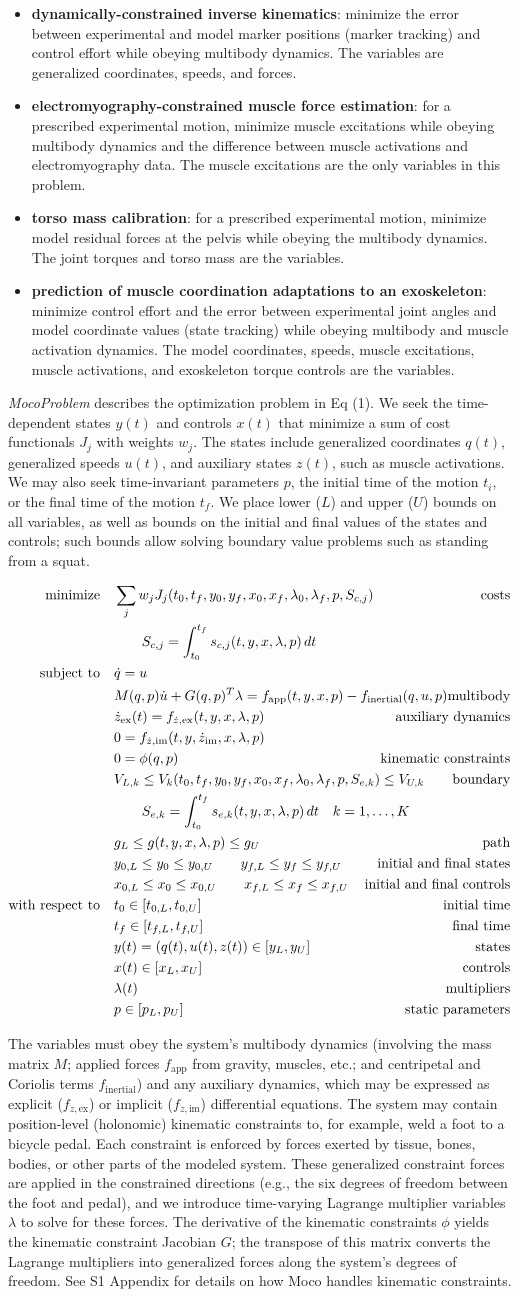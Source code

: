 \documentclass[10pt,letterpaper]{article}
\newcommand{\ocp}{
\begin{align}
    \begin{aligned}
        \mbox{minimize}
         \quad & \sum_j w_{j} J_{j}(t_0, t_f, y_0, y_f, x_{0}, \mathrlap{x_{f}, \lambda_0, \lambda_f, p, S_{c,j})} & \textrm{costs} \\
        & \quad\quad S_{c,j} = \int_{t_0}^{t_f} s_{c,j}(t, y, x, \lambda, p)\,dt  \\
        \mbox{subject to}
         \quad & \dot{q} = u \\
         & \mathrlap{M(q, p)\dot{u} + G(q, p)^T \lambda = f_{\mathrm{app}}(t, y, x, p) - f_{\mathrm{inertial}}(q, u, p)}  & \textrm{multibody} \\
         & \dot{z}_\textrm{ex}(t) = f_{\dot{z},\textrm{ex}}(t, y, x, \lambda, p) & \textrm{auxiliary dynamics} \\
         & 0 = f_{\dot{z},\textrm{im}}(t, y, \dot{z}_{\textrm{im}}, x, \lambda, p) \\
         & 0 = \phi(q, p) & \textrm{kinematic constraints} \\
         & V_{L,k} \leq V_k(t_0, t_f, y_0, y_f, x_{0}, x_{f}, \lambda_0, \lambda_f, p, \mathrlap{S_{e,k}) \leq V_{U,k}} & \textrm{boundary} \\
         & \quad\quad S_{e,k} = \mathrlap{\int_{t_0}^{t_f} s_{e,k}(t, y, x, \lambda, p)\,dt \quad k = 1, \ldots, K}\\
         & g_{L} \leq g(t, y, x, \lambda, p) \leq g_{U} & \textrm{path} \\
         & y_{0,L} \leq y_0 \leq y_{0,U} \quad\quad y_{f,L} \leq y_f \leq y_{f,U} & \textrm{initial and final states} \\
         & x_{0,L} \leq x_0 \leq x_{0,U} \quad\quad x_{f,L} \leq x_f \leq x_{f,U} & \textrm{initial and final controls} \\
         \mbox{with respect to} \quad
         & t_0 \in [t_{0,L}, t_{0,U}] & \textrm{initial time} \\
         & t_f \in [t_{f,L}, t_{f,U}] & \textrm{final time} \\
         & y(t) = (q(t), u(t), z(t)) \in [y_{L}, y_{U}] & \textrm{states} \\
         & x(t) \in [x_{L}, x_{U}] & \textrm{controls} \\
         & \lambda(t) & \textrm{multipliers} \\
         & p \in [p_{L}, p_{U}] & \textrm{static parameters}
    \end{aligned}
\end{align}
}
\begin{document}
\begin{itemize}
\item \textbf{dynamically-constrained inverse kinematics}: minimize the error between experimental and model marker positions (marker tracking) and control effort while obeying multibody dynamics. The variables are generalized coordinates, speeds, and forces.
\item \textbf{electromyography-constrained muscle force estimation}: for a prescribed experimental motion, minimize muscle excitations while obeying multibody dynamics and the difference between muscle activations and electromyography data. The muscle excitations are the only variables in this problem.
\item \textbf{torso mass calibration}: for a prescribed experimental motion, minimize model residual forces at the pelvis while obeying the multibody dynamics. The joint torques and torso mass are the variables.
\item \textbf{prediction of muscle coordination adaptations to an exoskeleton}: minimize control effort and the error between experimental joint angles and model coordinate values (state tracking) while obeying multibody and muscle activation dynamics. The model coordinates, speeds, muscle excitations, muscle activations, and exoskeleton torque controls are the variables.
\end{itemize}
\textit{MocoProblem} describes the optimization problem in Eq (1). We seek the time-dependent states $y(t)$ and controls $x(t)$ that minimize a sum of cost functionals $J_j$ with weights $w_j$. The states include generalized coordinates $q(t)$, generalized speeds $u(t)$, and auxiliary states $z(t)$, such as muscle activations. We may also seek time-invariant parameters $p$, the initial time of the motion $t_i$, or the final time of the motion $t_f$. We place lower ($L$) and upper ($U$) bounds on all variables, as well as bounds on the initial and final values of the states and controls; such bounds allow solving boundary value problems such as standing from a squat.

\ocp

The variables must obey the system’s multibody dynamics (involving the mass matrix $M$; applied forces $f_\mathrm{app}$ from gravity, muscles, etc.; and centripetal and Coriolis terms $f_\mathrm{inertial}$) and any auxiliary dynamics, which may be expressed as explicit ($f_{\dot{z},\mathrm{ex}}$) or implicit ($f_{\dot{z},\mathrm{im}}$) differential equations. The system may contain position-level (holonomic) kinematic constraints to, for example, weld a foot to a bicycle pedal. Each constraint is enforced by forces exerted by tissue, bones, bodies, or other parts of the modeled system. These generalized constraint forces are applied in the constrained directions (e.g., the six degrees of freedom between the foot and pedal), and we introduce time-varying Lagrange multiplier variables $\lambda$ to solve for these forces. The derivative of the kinematic constraints $\phi$ yields the kinematic constraint Jacobian $G$; the transpose of this matrix converts the Lagrange multipliers into generalized forces along the system’s degrees of freedom. See S1 Appendix for details on how Moco handles kinematic constraints.
\end{document}

